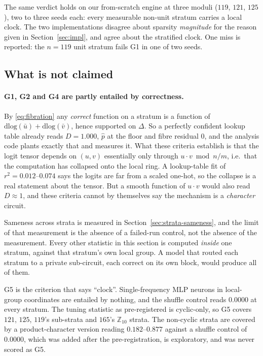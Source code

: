 The same verdict holds on our from-scratch engine at three moduli ($119$, $121$, $125$), two
to three seeds each: every measurable non-unit stratum carries a local clock. The two
implementations disagree about sparsity \emph{magnitude} for the reason given in
Section~\ref{sec:impl}, and agree about the stratified clock. One miss is reported:
the $n = 119$ unit stratum fails G1 in one of two seeds.

\subsection{What is not claimed}
\label{sec:strata-notclaimed}

\paragraph{G1, G2 and G4 are partly entailed by correctness.} By \eqref{eq:fibration} any
\emph{correct} function on a stratum is a function of $\mathrm{dlog}(\bar{u}) +
\mathrm{dlog}(\bar{v})$, hence supported on $\Delta$. So a perfectly confident lookup table
already reads $D = 1.000$, $\hat{p}$ at the floor and fibre residual $0$, and the analysis code
plants exactly that and measures it. What these criteria establish is that the logit tensor
depends on $(u,v)$ essentially only through $u \cdot v \bmod n/m$, i.e.\ that the computation
has collapsed onto the local ring. A lookup-table fit of $r^{2} = 0.012$--$0.074$ says the
logits are far from a scaled one-hot, so the collapse is a real statement about the tensor.
But a smooth function of $u \cdot v$ would also read $D \approx 1$, and these criteria cannot
by themselves say the mechanism is a \emph{character} circuit.

Sameness across strata is measured in Section~\ref{sec:strata-sameness}, and the limit of
that measurement is the absence of a failed-run control, not the absence of the
measurement. Every other statistic in this section is computed \emph{inside} one stratum,
against that stratum's own local group. A model that routed each stratum to a private
sub-circuit, each correct on its own block, would produce all of them.

G5 is the criterion that says ``clock''. Single-frequency MLP neurons in local-group
coordinates are entailed by nothing, and the shuffle control reads $0.0000$ at every stratum.
The tuning statistic as pre-registered is cyclic-only, so G5 covers $121$, $125$, $119$'s
sub-strata and $165$'s $\mathbb{Z}_{10}$ strata. The non-cyclic strata are covered by a
product-character version reading $0.182$--$0.877$ against a shuffle control of $0.0000$,
which was added after the pre-registration, is exploratory, and was never scored as G5.

